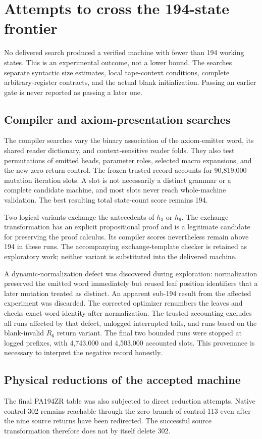 \section{Attempts to cross the 194-state frontier}
\label{sec:search}
No delivered search produced a verified machine with fewer than 194
working states. This is an experimental outcome, not a lower bound.
The searches separate syntactic size estimates, local tape-context
conditions, complete arbitrary-register contracts, and the actual blank
initialization. Passing an earlier gate is never reported as passing a
later one.

\subsection{Compiler and axiom-presentation searches}
The compiler searches vary the binary association of the axiom-emitter
word, its shared reader dictionary, and context-sensitive reader folds.
They also test permutations of emitted heads, parameter roles, selected
macro expansions, and the new zero-return control. The frozen trusted
record accounts for 90,819,000 mutation iteration slots. A slot is not
necessarily a distinct grammar or a complete candidate machine, and most
slots never reach whole-machine validation. The best resulting total
state-count score remains 194.

Two logical variants exchange the antecedents of $h_3$ or $h_6$. The
exchange transformation has an explicit propositional proof and is a
legitimate candidate for preserving the proof calculus. Its compiler
scores nevertheless remain above 194 in these runs. The accompanying
exchange-template checker is retained as exploratory work; neither
variant is substituted into the delivered machine.

A dynamic-normalization defect was discovered during exploration:
normalization preserved the emitted word immediately but reused leaf
position identifiers that a later mutation treated as distinct.
An apparent sub-194 result from the affected experiment was discarded.
The corrected optimizer renumbers the leaves and checks exact word
identity after normalization. The trusted accounting excludes all runs
affected by that defect, unlogged interrupted tails, and runs based on
the blank-invalid $R_6$ return variant. The final two bounded runs were
stopped at logged prefixes, with 4,743,000 and 4,503,000 accounted slots.
This provenance is necessary to interpret the negative record honestly.

\subsection{Physical reductions of the accepted machine}
The final PA194ZR table was also subjected to direct reduction attempts.
Native control 302 remains reachable through the zero branch of control
113 even after the nine source returns have been redirected. The
successful source transformation therefore does not by itself delete 302.

